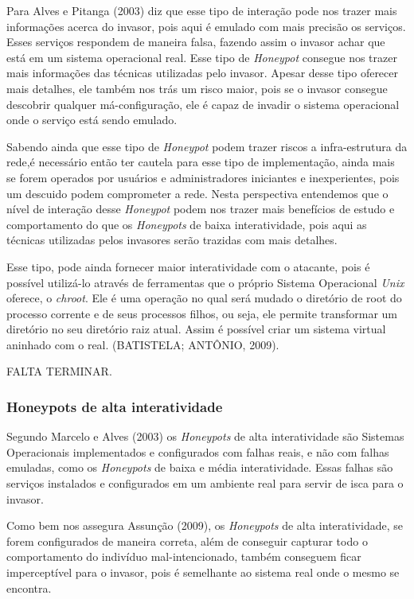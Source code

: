 Para Alves e Pitanga (2003) diz que esse tipo de interação pode nos trazer mais informações acerca do invasor, pois aqui é emulado com mais precisão os serviços. Esses serviços respondem de maneira falsa, fazendo assim o invasor achar que está em um sistema operacional real. Esse tipo de \textit{Honeypot} consegue nos trazer mais informações das técnicas utilizadas pelo invasor. Apesar desse tipo oferecer mais detalhes, ele também nos trás um risco maior, pois se o invasor consegue descobrir qualquer má-configuração, ele é capaz de invadir o sistema operacional onde o serviço está sendo emulado.

Sabendo ainda que esse tipo de \textit{Honeypot} podem trazer riscos a infra-estrutura da rede,é necessário então ter cautela para esse tipo de implementação, ainda mais se forem operados por usuários e administradores iniciantes e inexperientes, pois um descuido podem comprometer a rede. Nesta perspectiva entendemos que o nível de interação desse \textit{Honeypot} podem nos trazer mais benefícios de estudo e comportamento do que os \textit{Honeypots} de baixa interatividade, pois aqui as técnicas utilizadas pelos invasores serão trazidas com mais detalhes.

Esse tipo, pode ainda fornecer maior interatividade com o atacante, pois é possível utilizá-lo através de ferramentas que o próprio Sistema Operacional \textit{Unix} oferece, o \textit{chroot}. Ele é uma operação no qual será mudado o diretório de root do processo corrente e de seus processos filhos, ou seja, ele permite transformar um diretório no seu diretório raiz atual. Assim é possível criar um sistema virtual aninhado com o real. (BATISTELA; ANTÔNIO, 2009).

FALTA TERMINAR.

\subsubsection{Honeypots de alta interatividade}
Segundo Marcelo e Alves (2003) os \textit{Honeypots} de alta interatividade são Sistemas Operacionais implementados e configurados com falhas reais, e não com falhas emuladas, como os \textit{Honeypots} de baixa e média interatividade. Essas falhas são serviços instalados e configurados em um ambiente real para servir de isca para o invasor.

Como bem nos assegura Assunção (2009), os \textit{Honeypots} de alta interatividade, se forem configurados de maneira correta, além de conseguir capturar todo o comportamento do indivíduo mal-intencionado, também conseguem ficar imperceptível para o invasor, pois é semelhante ao sistema real onde o mesmo se encontra.

